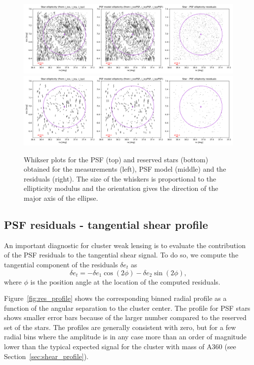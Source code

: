 \documentclass[SE,lsstdraft,authoryear,toc]{lsstdoc}
\begin{document}
\begin{figure}
\includegraphics[width=\textwidth]{Figures/whiskers_used.png}
\includegraphics[width=\textwidth]{Figures/whiskers_reserved.png}
\caption{Whikser plots for the PSF (top) and reserved stars (bottom) obtained for the measurements (left), PSF model (middle) and the residuals (right). The size of the whiskers is proportional to the ellipticity modulus and the orientation gives the direction of the major axis of the ellipse. \label{fig:whiskers}}
\end{figure}

\subsection{PSF residuals - tangential shear profile}

An important diagnostic for cluster weak lensing is to evaluate the contribution of the PSF residuals to the tangential shear signal. To do so, we compute the tangential component of the residuals $\delta e_t$ as 
\begin{equation}
\delta e_t = - \delta e_1  \cos(2 \phi) - \delta e_2  \sin(2 \phi),
\end{equation}
where $\phi$ is the position angle at the location of the computed residuals.

Figure~{\ref{fig:res_profile}} shows the corresponding binned radial profile as a function of the angular separation to the cluster center. The profile for PSF stars shows smaller error bars because of the larger number compared to the reserved set of the stars. The profiles are generally consistent with zero, but for a few radial bins where the amplitude is in any case more than an order of magnitude lower than the typical expected signal for the cluster with mass of A360 (see Section~\ref{sec:shear_profile}). 
\end{document}
